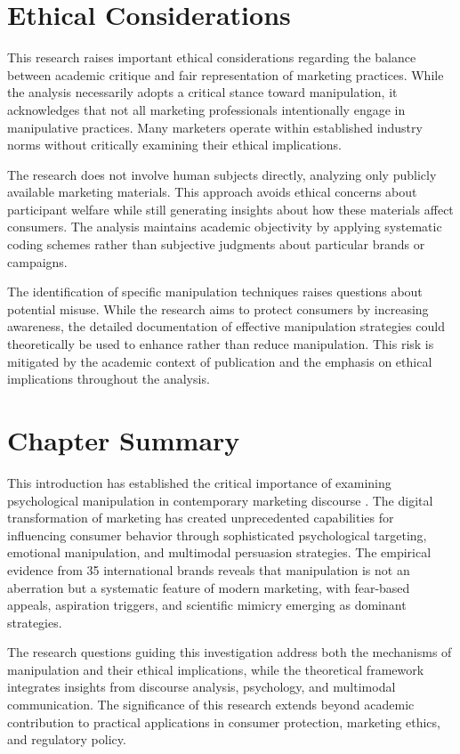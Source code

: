 \section{Ethical Considerations}
\label{sec:ethical_considerations}

This research raises important ethical considerations regarding the balance between academic critique and fair representation of marketing practices. While the analysis necessarily adopts a critical stance toward manipulation, it acknowledges that not all marketing professionals intentionally engage in manipulative practices. Many marketers operate within established industry norms without critically examining their ethical implications.

The research does not involve human subjects directly, analyzing only publicly available marketing materials. This approach avoids ethical concerns about participant welfare while still generating insights about how these materials affect consumers. The analysis maintains academic objectivity by applying systematic coding schemes rather than subjective judgments about particular brands or campaigns.

The identification of specific manipulation techniques raises questions about potential misuse. While the research aims to protect consumers by increasing awareness, the detailed documentation of effective manipulation strategies could theoretically be used to enhance rather than reduce manipulation. This risk is mitigated by the academic context of publication and the emphasis on ethical implications throughout the analysis.

\section{Chapter Summary}
\label{sec:chapter_summary}

This introduction has established the critical importance of examining psychological manipulation in contemporary marketing discourse \cite{fairclough2015language}. The digital transformation of marketing has created unprecedented capabilities for influencing consumer behavior through sophisticated psychological targeting, emotional manipulation, and multimodal persuasion strategies. The empirical evidence from 35 international brands reveals that manipulation is not an aberration but a systematic feature of modern marketing, with fear-based appeals, aspiration triggers, and scientific mimicry emerging as dominant strategies.

The research questions guiding this investigation address both the mechanisms of manipulation and their ethical implications, while the theoretical framework integrates insights from discourse analysis, psychology, and multimodal communication. The significance of this research extends beyond academic contribution to practical applications in consumer protection, marketing ethics, and regulatory policy.

